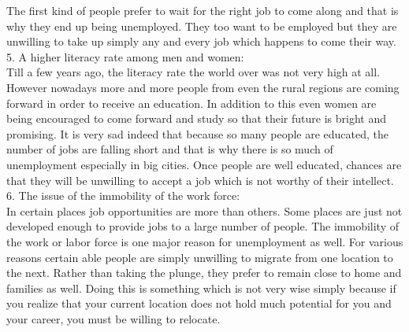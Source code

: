 \documentclass[8pt]{article}
\begin{document}
The first kind of people prefer to wait for the right job to come along and that is why they end up being unemployed. They too want to be employed but they are unwilling to take up simply any and every job which happens to come their way.\\
5. A higher literacy rate among men and women:\\
Till a few years ago, the literacy rate the world over was not very high at all. However nowadays more and more people from even the rural regions are coming forward in order to receive an education.
In addition to this even women are being encouraged to come forward and study so that their future is bright and promising. It is very sad indeed that because so many people are educated, the number of jobs are falling short and that is why there is so much of unemployment especially in big cities.
Once people are well educated, chances are that they will be unwilling to accept a job which is not worthy of their intellect.\\
6. The issue of the immobility of the work force:\\
In certain places job opportunities are more than others. Some places are just not developed enough to provide jobs to a large number of people.
The immobility of the work or labor force is one major reason for unemployment as well. For various reasons certain able people are simply unwilling to migrate from one location to the next. Rather than taking the plunge, they prefer to remain close to home and families as well.
Doing this is something which is not very wise simply because if you realize that your current location does not hold much potential for you and your career, you must be willing to relocate.\\
\end{document}
